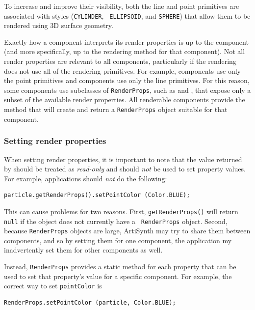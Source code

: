 To increase and improve their visibility, both the line and point
primitives are associated with styles ({\tt CYLINDER}, {\tt
ELLIPSOID}, and {\tt SPHERE}) that allow them to be rendered using 3D
surface geometry.

Exactly how a component interprets its render properties is up to the
component (and more specifically, up to the rendering method for that
component).  Not all render properties are relevant to all components,
particularly if the rendering does not use all of the rendering
primitives. For example,
 components use only
the point primitives and
 components use only
the line primitives. For this reason, some components use subclasses
of {\tt RenderProps}, such as
 and
, that expose only a subset
of the available render properties. All renderable components provide
the method
 that
will create and return a {\tt RenderProps} object suitable for that
component.

\subsubsection{Setting render properties}

When setting render properties, it is important to note that
the value returned by
should be treated as {\it read-only} and should {\it not}
be used to set property values.
For example, applications should {\it not} do the
following:
\begin{lstlisting}[]
   particle.getRenderProps().setPointColor (Color.BLUE);
\end{lstlisting}
%
This can cause problems for two reasons. First, {\tt getRenderProps()}
will return {\tt null} if the object does not currently have a {\tt
RenderProps} object. Second, because {\tt RenderProps} objects are
large, ArtiSynth may try to share them between components, and so by
setting them for one component, the application my inadvertently set
them for other components as well.

Instead, {\tt RenderProps} provides a static method for each property
that can be used to set that property's value for a specific
component.  For example, the correct way to set {\tt pointColor} is
%
\begin{lstlisting}[]
   RenderProps.setPointColor (particle, Color.BLUE);
\end{lstlisting}
%


